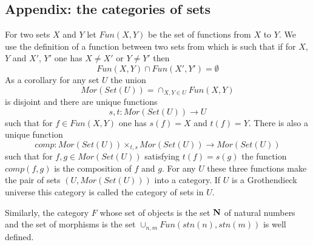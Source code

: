 \documentclass[11pt]{article}
\newcommand{\sr}{\rightarrow}
\newcommand{\nn}{{\bf N\rm}}
\begin{document}
\subsection{Appendix: the categories of sets}
%
For two sets $X$ and $Y$ let $Fun(X,Y)$ be the set of functions from $X$ to $Y$. We use the definition of a function between two sets from \cite[p.81]{Bourbaki} which is such that if for $X$, $Y$ and $X'$, $Y'$ one has $X\ne X'$ or $Y\ne Y'$ then  
%
$$Fun(X,Y)\cap Fun(X',Y')=\emptyset$$
%
As a corollary for any set $U$ the union 
%
$$Mor(Set(U))=\cap_{X,Y\in U}Fun(X,Y)$$
%
is disjoint and there are unique functions
%
$$s,t:Mor(Set(U))\sr U$$
%
such that for $f\in Fun(X,Y)$ one has $s(f)=X$ and $t(f)=Y$. There is also a unique function 
%
$$comp:Mor(Set(U))\times_{t,s}Mor(Set(U))\sr Mor(Set(U))$$
%
such that for $f,g\in Mor(Set(U))$ satisfying $t(f)=s(g)$ the function $comp(f,g)$ is the composition of $f$ and $g$. For any $U$ these three functions make the pair of sets $(U,Mor(Set(U)))$ into a category. If $U$ is a Grothendieck universe this category is called the category of sets in $U$.

Similarly, the category $F$ whose set of objects is the set $\nn$ of natural numbers and the set of morphisms is the set $\cup_{n,m}Fun(stn(n),stn(m))$ is well defined. 
%















\end{document}
